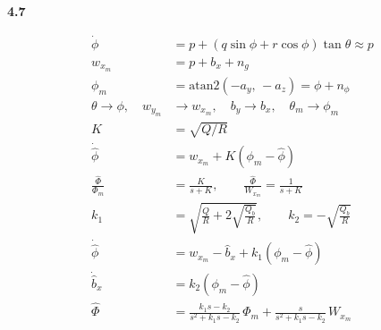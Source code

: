 \documentclass[11pt]{article}
\begin{document}
\newpage
\textbf{4.7}

\begin{align*}
\dot\phi &= p + (q\sin\phi + r\cos\phi)\tan\theta \approx p\\
w_{x_m} &= p + b_x + n_g\\
\phi_m &= \mathrm{atan2}(-a_y,\,-a_z) = \phi + n_\phi\\[1ex]
\theta \to \phi,\quad w_{y_m} &\to w_{x_m},\quad b_y \to b_x,\quad \theta_m \to \phi_m\\[1ex]
K &= \sqrt{Q/R}\\
\dot{\hat\phi} &= w_{x_m} + K(\phi_m - \hat\phi)\\
\frac{\hat\Phi}{\Phi_m} &= \frac{K}{s+K}, \qquad \frac{\hat\Phi}{W_{x_m}} = \frac{1}{s+K}\\[1ex]
k_1 &= \sqrt{\frac{Q}{R} + 2\sqrt{\frac{Q_b}{R}}}, \qquad k_2 = -\sqrt{\frac{Q_b}{R}}\\
\dot{\hat\phi} &= w_{x_m} - \hat b_x + k_1(\phi_m - \hat\phi)\\
\dot{\hat b}_x &= k_2(\phi_m - \hat\phi)\\
\hat\Phi &= \frac{k_1 s - k_2}{s^2 + k_1 s - k_2}\,\Phi_m
+ \frac{s}{s^2 + k_1 s - k_2}\,W_{x_m}
\end{align*}
\end{document}
